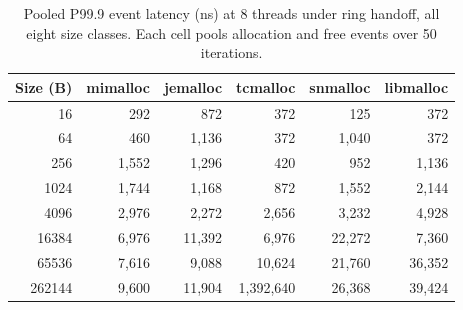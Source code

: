 \begin{table}[!htbp]
\centering
\footnotesize
\setlength{\tabcolsep}{3pt}
\caption{Pooled P99.9 event latency (ns) at 8 threads under ring handoff, all eight size classes. Each cell pools allocation and free events over 50 iterations.}
\label{tab:atlas-ring}
\begin{tabular}{rrrrrr}
\toprule
Size (B) & mimalloc & jemalloc & tcmalloc & snmalloc & libmalloc \\
\midrule
16 & 292 & 872 & 372 & 125 & 372 \\
64 & 460 & 1{,}136 & 372 & 1{,}040 & 372 \\
256 & 1{,}552 & 1{,}296 & 420 & 952 & 1{,}136 \\
1024 & 1{,}744 & 1{,}168 & 872 & 1{,}552 & 2{,}144 \\
4096 & 2{,}976 & 2{,}272 & 2{,}656 & 3{,}232 & 4{,}928 \\
16384 & 6{,}976 & 11{,}392 & 6{,}976 & 22{,}272 & 7{,}360 \\
65536 & 7{,}616 & 9{,}088 & 10{,}624 & 21{,}760 & 36{,}352 \\
262144 & 9{,}600 & 11{,}904 & 1{,}392{,}640 & 26{,}368 & 39{,}424 \\
\bottomrule
\end{tabular}
\end{table}
